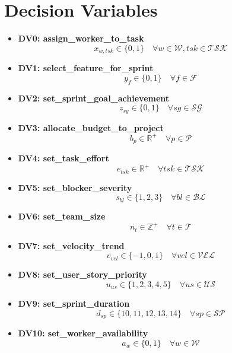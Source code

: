 \documentclass{article}
\begin{document}
\section{Decision Variables}
\begin{itemize}
    \item \textbf{DV0: assign\_worker\_to\_task}
    \[
    x_{w,tsk} \in \{0,1\} \quad \forall w \in \mathcal{W}, tsk \in \mathcal{TSK}
    \]
    \item \textbf{DV1: select\_feature\_for\_sprint}
    \[
    y_f \in \{0,1\} \quad \forall f \in \mathcal{F}
    \]
    \item \textbf{DV2: set\_sprint\_goal\_achievement}
    \[
    z_{sg} \in \{0,1\} \quad \forall sg \in \mathcal{SG}
    \]
    \item \textbf{DV3: allocate\_budget\_to\_project}
    \[
    b_p \in \mathbb{R}^+ \quad \forall p \in \mathcal{P}
    \]
    \item \textbf{DV4: set\_task\_effort}
    \[
    e_{tsk} \in \mathbb{R}^+ \quad \forall tsk \in \mathcal{TSK}
    \]
    \item \textbf{DV5: set\_blocker\_severity}
    \[
    s_{bl} \in \{1,2,3\} \quad \forall bl \in \mathcal{BL}
    \]
    \item \textbf{DV6: set\_team\_size}
    \[
    n_t \in \mathbb{Z}^+ \quad \forall t \in \mathcal{T}
    \]
    \item \textbf{DV7: set\_velocity\_trend}
    \[
    v_{vel} \in \{-1,0,1\} \quad \forall vel \in \mathcal{VEL}
    \]
    \item \textbf{DV8: set\_user\_story\_priority}
    \[
    u_{us} \in \{1,2,3,4,5\} \quad \forall us \in \mathcal{US}
    \]
    \item \textbf{DV9: set\_sprint\_duration}
    \[
    d_{sp} \in \{10,11,12,13,14\} \quad \forall sp \in \mathcal{SP}
    \]
    \item \textbf{DV10: set\_worker\_availability}
    \[
    a_w \in \{0,1\} \quad \forall w \in \mathcal{W}
    \]
\end{itemize}
\end{document}
